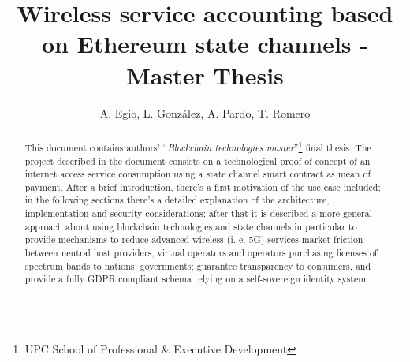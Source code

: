 \documentclass[12pt]{amsart}
\title{Wireless service accounting based on Ethereum state channels
- Master Thesis}
\author{
  A. Egio,
  L. González, A. Pardo, T. Romero
}
\begin{document}
\pagecolor{pagecolor}


\begin{abstract}
  \begin{center}
    This document contains authors' ``\textit{Blockchain
      technologies master}''\footnote{UPC School
      of Professional \& Executive Development}
    final thesis. The project described in the document
    consists on a technological proof
    of concept of an internet access service consumption
    using a state channel smart contract as
    mean of payment. After a brief
    introduction, there's a first motivation of
    the use case included;
    in the following sections
    there's a detailed explanation of
    the architecture, implementation and
    security considerations;
    after that it is described a more
    general approach about using blockchain technologies
    and state channels in particular to provide
    mechanisms to reduce advanced wireless
    (i. e. 5G) services market friction between neutral host
    providers, virtual operators and operators
    purchasing licenses of spectrum bands to nations' governments;
    guarantee transparency to consumers,
    and provide a fully GDPR compliant
    schema relying on a self-sovereign identity system.
  \end{center}
\end{abstract}

\maketitle

\tableofcontents

\newpage
\end{document}
